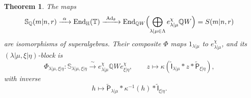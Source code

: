 \documentclass[11pt,a4paper]{amsart}
\newtheorem{theorem}{Theorem}[section]
\theoremstyle{definition}
\theoremstyle{remark}
\newcommand{\Q}{\mathbb Q}
\newcommand{\bS}{\mathbb S}
\newcommand{\bH}{\mathbb H}
\newcommand{\bT}{\mathbb T}
\newcommand{\End}{\operatorname{End}}
\newcommand{\Ad}{\operatorname{Ad}}
\newcommand{\lm}{\lambda|\mu}
\newcommand{\xh}{\xi|\eta}
\numberwithin{equation}{section}
\begin{document}
\begin{theorem}\label{thm:schur-isomorphism}
The maps
$$
\bS_\Q(m|n,r)\xrightarrow{\ \alpha\ }\End_{\bH}(\bT)\xrightarrow{\ \Ad_\theta\ }
\End_{\Q W}\Bigl(\bigoplus_{\lm\in\Lambda}e^\chi_{\lm}\Q W\Bigr)=S(m|n,r)
$$
are isomorphisms of superalgebras. Their composite $\Phi$ maps $1_{\lm}$
to $e^\chi_{\lm}$, and its $(\lm,\xh)$-block is
\begin{equation}\label{eq:final-isomorphism}
\Phi_{\lm,\xh}:\bS_{\lm,\xh}\xrightarrow{\ \sim\ }e^\chi_{\lm}\Q We^\chi_{\xh},
\qquad
z\longmapsto\kappa(\widetilde{\mathsf I}_{\lm}*z*\widetilde{\mathsf P}_{\xh}),
\end{equation}
with inverse
\begin{equation}\label{eq:final-inverse}
h\longmapsto \widetilde{\mathsf P}_{\lm}*\kappa^{-1}(h)*\widetilde{\mathsf I}_{\xh}.
\end{equation}
\end{theorem}
\end{document}
